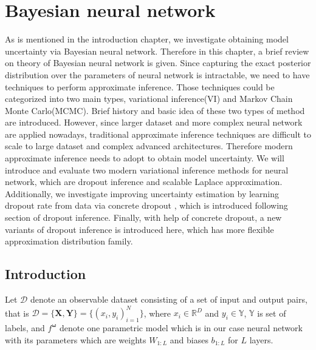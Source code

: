 \chapter{Bayesian neural network}
\thispagestyle{empty}%

As is mentioned in the introduction chapter, we investigate obtaining model uncertainty via Bayesian neural network. Therefore in this chapter, a brief review on theory of Bayesian neural network is given. Since capturing the exact posterior distribution over the parameters of neural network is intractable, we need to have techniques to perform approximate inference. Those techniques could be categorized into two main types, variational inference(VI) and Markov Chain Monte Carlo(MCMC). Brief history and basic idea of these two types of method are introduced. However, since larger dataset and more complex neural network are applied nowadays, traditional approximate inference techniques are difficult to scale to large dataset and complex advanced architectures. Therefore modern approximate inference needs to adopt to obtain model uncertainty. We will introduce and evaluate two modern variational inference methods for neural network, which are dropout inference\cite{gal2016dropout} and scalable Laplace approximation\cite{ritter2018scalable}. Additionally, we investigate improving uncertainty estimation by learning dropout rate from data via concrete dropout \cite{gal2017concrete}, which is introduced following section of dropout inference. Finally, with help of concrete dropout, a new variants of dropout inference is introduced here, which has more flexible approximation distribution family.


\newpage
\section{Introduction}

Let $\mathcal{D}$ denote an observable dataset consisting of a set of input and output pairs, that is $\mathcal{D} = \{\mathbf{X}, \mathbf{Y}\} = \{(x_{i}, y_{i})_{i=1}^{N}\}$, where $x_{i}\in\mathbb{R}^{D}$ and $y_{i}\in\mathbb{Y}$, $\mathbb{Y}$ is set of labels, and $f^{\boldsymbol{\omega}}$ denote one parametric model which is in our case neural network with {\boldmath{$\omega$}} its parameters which are weights $W_{1:L}$ and biases $b_{1:L}$ for $L$ layers.

